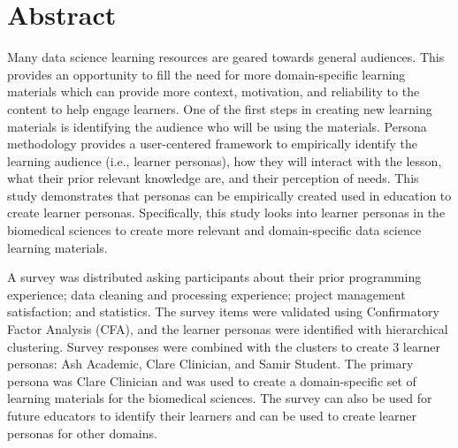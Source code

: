 \documentclass[../main.tex]{subfiles}
\begin{document}
\section*{Abstract}



    Many data science learning resources are geared towards general audiences.
    This provides an opportunity to fill the need for more domain-specific learning materials
    which can provide more context, motivation, and reliability to the content to help engage learners.
    One of the first steps in creating new learning materials is identifying the audience who will
    be using the materials.
    Persona methodology provides a user-centered framework to empirically identify
    the learning audience (i.e., learner personas), how they will interact with the lesson,
    what their prior relevant knowledge are,
    and their perception of needs.
    This study demonstrates that personas can be empirically created used in education to create learner personas.
    Specifically, this study looks into learner personas in the biomedical sciences to
    create more relevant and domain-specific data science learning materials.
    
    A survey was distributed asking participants about their
    prior programming experience;
    data cleaning and processing experience;
    project management satisfaction; and
    statistics.
    The survey items were validated using Confirmatory Factor Analysis (CFA),
    and the learner personas were identified with hierarchical clustering.
    Survey responses were combined with the clusters to create 3 learner personas:
    Ash Academic, Clare Clinician, and Samir Student.
    The primary persona was Clare Clinician and was used to create a domain-specific
    set of learning materials for the biomedical sciences.
    The survey can also be used for future educators to identify their learners
    and can be used to create learner personas for other domains.
\end{document}
